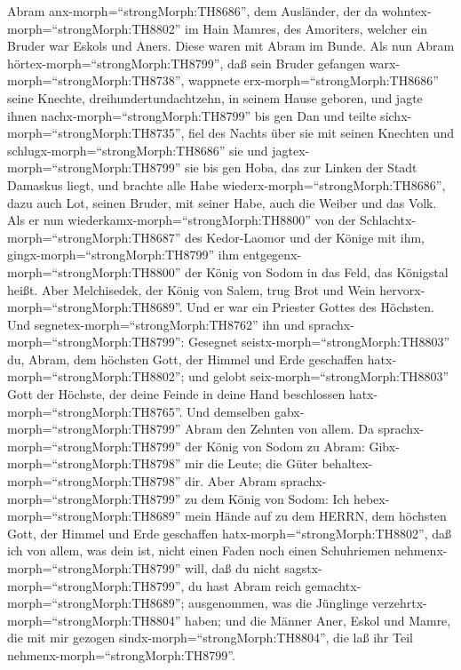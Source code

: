 Abram anx-morph=``strongMorph:TH8686'', dem Ausländer, der da
wohntex-morph=``strongMorph:TH8802'' im Hain Mamres, des Amoriters,
welcher ein Bruder war Eskols und Aners. Diese waren mit Abram im Bunde.
 Als nun Abram hörtex-morph=``strongMorph:TH8799'', daß
sein Bruder gefangen warx-morph=``strongMorph:TH8738'', wappnete
erx-morph=``strongMorph:TH8686'' seine Knechte, dreihundertundachtzehn,
in seinem Hause geboren, und jagte ihnen
nachx-morph=``strongMorph:TH8799'' bis gen Dan  und teilte
sichx-morph=``strongMorph:TH8735'', fiel des Nachts über sie mit seinen
Knechten und schlugx-morph=``strongMorph:TH8686'' sie und
jagtex-morph=``strongMorph:TH8799'' sie bis gen Hoba, das zur Linken der
Stadt Damaskus liegt,  und brachte alle Habe
wiederx-morph=``strongMorph:TH8686'', dazu auch Lot, seinen Bruder, mit
seiner Habe, auch die Weiber und das Volk.  Als er nun
wiederkamx-morph=``strongMorph:TH8800'' von der
Schlachtx-morph=``strongMorph:TH8687'' des Kedor-Laomor und der Könige
mit ihm, gingx-morph=``strongMorph:TH8799'' ihm
entgegenx-morph=``strongMorph:TH8800'' der König von Sodom in das Feld,
das Königstal heißt.  Aber Melchisedek, der König von
Salem, trug Brot und Wein hervorx-morph=``strongMorph:TH8689''. Und er
war ein Priester Gottes des Höchsten.  Und
segnetex-morph=``strongMorph:TH8762'' ihn und
sprachx-morph=``strongMorph:TH8799'': Gesegnet
seistx-morph=``strongMorph:TH8803'' du, Abram, dem höchsten Gott, der
Himmel und Erde geschaffen hatx-morph=``strongMorph:TH8802'';
 und gelobt seix-morph=``strongMorph:TH8803'' Gott der
Höchste, der deine Feinde in deine Hand beschlossen
hatx-morph=``strongMorph:TH8765''. Und demselben
gabx-morph=``strongMorph:TH8799'' Abram den Zehnten von allem.
 Da sprachx-morph=``strongMorph:TH8799'' der König von
Sodom zu Abram: Gibx-morph=``strongMorph:TH8798'' mir die Leute; die
Güter behaltex-morph=``strongMorph:TH8798'' dir.  Aber
Abram sprachx-morph=``strongMorph:TH8799'' zu dem König von Sodom: Ich
hebex-morph=``strongMorph:TH8689'' mein Hände auf zu dem HERRN, dem
höchsten Gott, der Himmel und Erde geschaffen
hatx-morph=``strongMorph:TH8802'',  daß ich von allem, was
dein ist, nicht einen Faden noch einen Schuhriemen
nehmenx-morph=``strongMorph:TH8799'' will, daß du nicht
sagstx-morph=``strongMorph:TH8799'', du hast Abram reich
gemachtx-morph=``strongMorph:TH8689'';  ausgenommen, was
die Jünglinge verzehrtx-morph=``strongMorph:TH8804'' haben; und die
Männer Aner, Eskol und Mamre, die mit mir gezogen
sindx-morph=``strongMorph:TH8804'', die laß ihr Teil
nehmenx-morph=``strongMorph:TH8799''.

